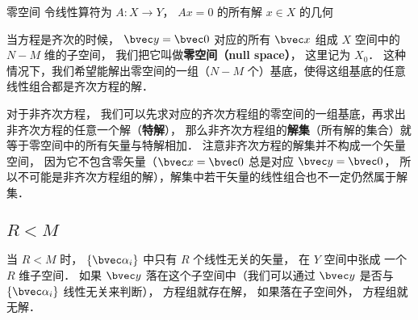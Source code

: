 \begin{definition}{零空间}
令线性算符为 $A: X\to Y$， $A x = 0$ 的所有解 $x\in X$ 的几何
\end{definition}

当方程是齐次的时候， $\bvec y = \bvec 0$ 对应的所有 $\bvec x$ 组成 $X$ 空间中的 $N- M$ 维的子空间， 我们把它叫做\textbf{零空间（null space）}， 这里记为 $X_0$． 这种情况下，我们希望能解出零空间的一组（$N - M$ 个）基底，使得这组基底的任意线性组合都是齐次方程的解．

对于非齐次方程， 我们可以先求对应的齐次方程组的零空间的一组基底，再求出非齐次方程的任意一个解（\textbf{特解}）， 那么非齐次方程组的\textbf{解集}（所有解的集合）就等于零空间中的所有矢量与特解相加． 注意非齐次方程的解集并不构成一个矢量空间， 因为它不包含零矢量（$\bvec x = \bvec 0$ 总是对应 $\bvec y = \bvec 0$， 所以不可能是非齐次方程组的解），解集中若干矢量的线性组合也不一定仍然属于解集．

\subsection{$R < M$}
当 $R < M$ 时， $\{\bvec \alpha_i\}$ 中只有 $R$ 个线性无关的矢量， 在 $Y$ 空间中张成%
一个 $R$ 维子空间． 如果 $\bvec y$ 落在这个子空间中（我们可以通过 $\bvec y$ 是否与 $\{\bvec \alpha_i\}$ 线性无关来判断）， 方程组就存在解， 如果落在子空间外， 方程组就无解．


